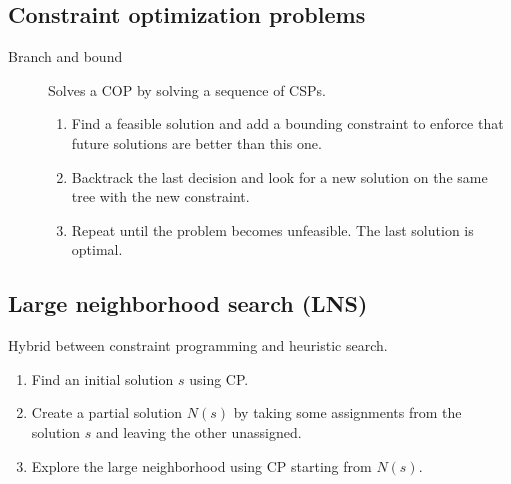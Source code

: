 \subsection{Constraint optimization problems}

\begin{description}
    \item[Branch and bound] 
        Solves a COP by solving a sequence of CSPs.
        \begin{enumerate}
            \item Find a feasible solution and add a bounding constraint 
                to enforce that future solutions are better than this one.
            \item Backtrack the last decision and look for a new solution on the same tree with the new constraint.
            \item Repeat until the problem becomes unfeasible. The last solution is optimal.
        \end{enumerate}
\end{description}


\subsection{Large neighborhood search (LNS)}

Hybrid between constraint programming and heuristic search.
\begin{enumerate}
    \item Find an initial solution $s$ using CP.
    \item Create a partial solution $N(s)$ by taking some assignments from the solution $s$ and leaving the other unassigned.
    \item Explore the large neighborhood using CP starting from $N(s)$.
\end{enumerate}